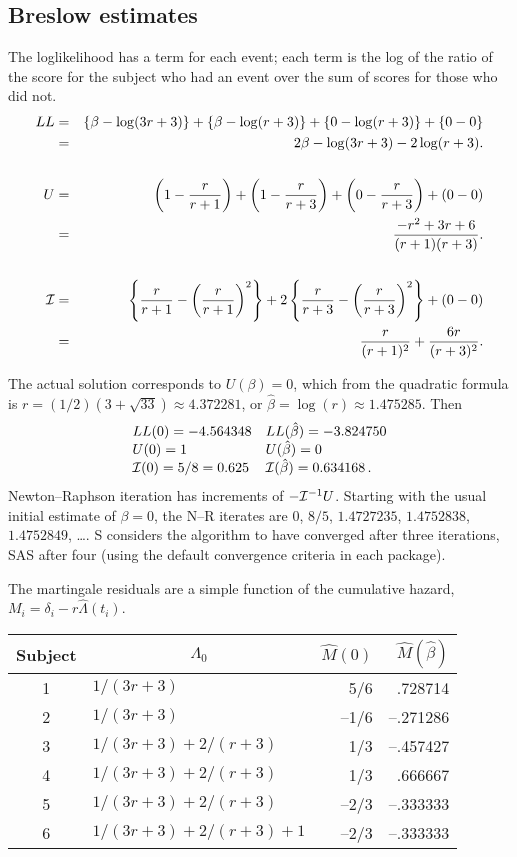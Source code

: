 \documentclass[11pt]{article}
\def\bhat{\hat \beta}        %
\def\Mhat{\widehat M}        %
\def\lhat{\hat \Lambda}
\def\imat{{\cal I}}
\def\Cvar{{\cal I}^{-1}}
\begin{document}
\subsection{Breslow estimates}
\label{sect:valbreslow}
The loglikelihood has a term for each event; each term is
the log of the ratio of the score for the subject who had an event over
the sum of scores for those who did not.
\begin{eqnarray*}
LL &=& \{\beta- \log(3r+3)\} + \{\beta - \log(r+3)\} + \{0-\log(r+3)\} + \{0-0\} \\
   &=& 2\beta - \log(3r+3) - 2\log(r+3). \\ \\
U &=& \left(1-\frac{r}{r+1}\right) + \left(1-\frac{r}{r+3}\right) + 
	\left(0-\frac{r}{r+3} \right) + (0-0) \\
  &=& \frac{-r^2 + 3r + 6}{(r+1)(r+3)} .\\ \\
\imat&=&     \left\{\frac{r}{r+1} - \left( \frac{r}{r+1} \right )^2\right\}
        +2 \left\{\frac{r}{r+3} - \left( \frac{r}{r+3} \right )^2\right\} +
		 (0-0) \\
  &=& \frac{r}{(r+1)^2} + \frac{6r}{(r+3)^2}.
\end{eqnarray*}

The actual solution corresponds to $U(\beta)=0$, which from the quadratic
formula is $r=(1/2)(3 + \sqrt{33}) \approx 4.372281$,
or $\bhat = \log(r) \approx 1.475285$.  
Then
$$
\begin{array}{ll}
 LL(0)=-4.564348 & LL(\bhat)=-3.824750 \\
 U(0) = 1 & U(\bhat) = 0 \\
 \imat(0) = 5/8 =0.625 & \imat(\bhat) = 0.634168 \,.
\end{array}
$$
Newton--Raphson iteration has increments of $-\Cvar U$.
Starting with the usual initial estimate of $\beta=0$, the
N--R iterates are $0$, $8/5$, $1.4727235$, $1.4752838$, $1.4752849$, \ldots .
S considers the algorithm to have converged after three iterations,
SAS after four (using the default convergence criteria in each package).

The martingale residuals are a simple function of the cumulative hazard,
$M_i = \delta_i - r\lhat(t_i)$.
\begin{center}
\begin{tabular}{c|lrr}
Subject &\multicolumn{1}{c}{$\Lambda_0$} & $\Mhat(0)$ & $\Mhat(\bhat)$ \\ 
	\hline
1& $1/(3r+3)$ & 5/6 & .728714 \\
2& $1/(3r+3)$ & --1/6& --.271286 \\
3& $1/(3r+3) + 2/(r+3)$ &1/3 & --.457427 \\
4& $1/(3r+3) + 2/(r+3)$ &1/3 & .666667 \\
5&   $1/(3r+3) + 2/(r+3)$ &--2/3 & --.333333 \\
6 &   $1/(3r+3) + 2/(r+3) +1$ & --2/3 & --.333333 
\end{tabular}
\end{center}
\end{document}
